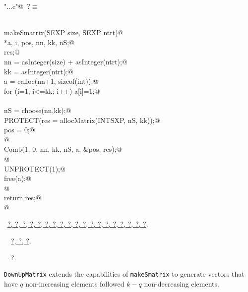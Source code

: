 \documentclass[reqno]{amsart}
\renewcommand{\NWtarget}[2]{\hypertarget{#1}{#2}}
\renewcommand{\NWlink}[2]{\hyperlink{#1}{#2}}
\begin{document}
\begin{flushleft} \small
\begin{minipage}{\linewidth}\label{scrap14}\raggedright\small
\NWtarget{nuweb?}{} \verb@"..\src\ReprodCalcs.c"@\nobreak\ {\footnotesize {?}}$\equiv$
\vspace{-1ex}
\begin{list}{}{} \item
\mbox{}\verb@@\\
\mbox{}\verb@SEXP makeSmatrix(SEXP size, SEXP ntrt){@\\
\mbox{}\verb@int *a, i, pos, nn, kk, nS;@\\
\mbox{}\verb@SEXP res;@\\
\mbox{}\verb@   nn = asInteger(size) + asInteger(ntrt);@\\
\mbox{}\verb@   kk = asInteger(ntrt);@\\
\mbox{}\verb@   a = calloc(nn+1, sizeof(int));@\\
\mbox{}\verb@   for (i=1; i<=kk; i++) a[i]=1;@\\
\mbox{}\verb@@\\
\mbox{}\verb@   nS = choose(nn,kk);@\\
\mbox{}\verb@   PROTECT(res = allocMatrix(INTSXP, nS, kk));@\\
\mbox{}\verb@   pos = 0;@\\
\mbox{}\verb@   @\\
\mbox{}\verb@   Comb(1, 0, nn, kk, nS, a, &pos, res);@\\
\mbox{}\verb@  @\\
\mbox{}\verb@   UNPROTECT(1);@\\
\mbox{}\verb@   free(a);@\\
\mbox{}\verb@ @\\
\mbox{}\verb@  return res;@\\
\mbox{}\verb@}@\\
\mbox{}\verb@@{\NWsep}
\end{list}
\vspace{-1.5ex}
\footnotesize
\begin{list}{}{\setlength{\itemsep}{-\parsep}\setlength{\itemindent}{-\leftmargin}}
\item \NWtxtFileDefBy\ \NWlink{nuweb?}{?}\NWlink{nuweb?}{, ?}\NWlink{nuweb?}{, ?}\NWlink{nuweb?}{, ?}\NWlink{nuweb?}{, ?}\NWlink{nuweb?}{, ?}\NWlink{nuweb?}{, ?}\NWlink{nuweb?}{, ?}\NWlink{nuweb?}{, ?}\NWlink{nuweb?}{, ?}\NWlink{nuweb?}{, ?}\NWlink{nuweb?}{, ?}\NWlink{nuweb?}{, ?}\NWlink{nuweb?}{, ?}\NWlink{nuweb?}{, ?}\NWlink{nuweb?}{, ?}\NWlink{nuweb?}{, ?}\NWlink{nuweb?}{, ?}\NWlink{nuweb?}{, ?}.
\item \NWtxtIdentsDefed\nobreak\  \verb@makeSmatrix@\nobreak\ \NWlink{nuweb?}{?}\NWlink{nuweb?}{, ?}\NWlink{nuweb?}{, ?}.\item \NWtxtIdentsUsed\nobreak\  \verb@Comb@\nobreak\ \NWlink{nuweb?}{?}.
\item{}
\end{list}
\end{minipage}\vspace{4ex}
\end{flushleft}
\texttt{DownUpMatrix} extends the capabilities of \texttt{makeSmatrix} to generate
vectors that have $q$ non-increasing elements followed $k-q$ non-decreasing
elements.
\end{document}
